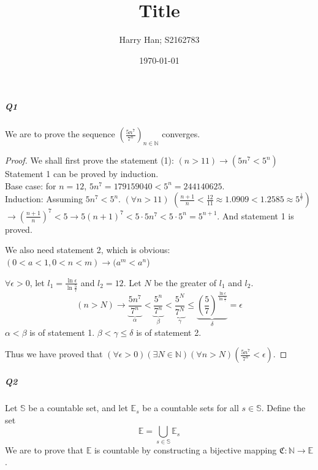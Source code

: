 \documentclass[12pt, a4paper]{article}
\title{Title}
\author{Harry Han; S2162783}
\date{\today}
\theoremstyle{definition}
\theoremstyle{remark}
\begin{document}
\subparagraph{Q1}
We are to prove the sequence $\left(\displaystyle \frac{5n^7}{7^n}\right)_{n \in \mathbb{N}}$ converges. 
\begin{proof}
	We shall first prove the statement (1): $(n>11)\rightarrow (5n^7<5^n)$
	Statement 1 can be proved by induction. \\
	Base case: for $n=12$, $5n^7 = 179159040<5^n=244140625.$ \\
	Induction: Assuming $5n^7<5^n$.
	$(\forall n>11)$ $(\frac{n+1}{n}<\frac{12}{11}\approx 1.0909<1.2585\approx 5^{\frac{1}{7}})$
	$\rightarrow (\frac{n+1}{n})^7<5 \rightarrow 5(n+1)^7 < 5\cdot 5n^7<5\cdot 5^n=5^{n+1}.$
	And statement 1 is proved. 

	We also need statement 2, which is obvious: $(0<a<1, 0<n<m) \rightarrow (a^m<a^n$)

	$\forall \epsilon > 0$, let $l_1 = \displaystyle \frac{\ln{\epsilon}}{\ln{\frac{5}{7}}}$ and $l_2 = 12$. 
	Let $N$ be the greater of $l_1$ and $l_2$. 
	$$
	(n>N) \rightarrow 
	\underbrace{\frac{5n^7}{7^n}}_{\alpha}
	<\underbrace{\frac{5^n}{7^n}}_{\beta}
	<\underbrace{\frac{5^N}{7^N}}_{\gamma}
	\leq \underbrace{
	\left(\frac{5}{7}\right)^{\frac{\ln{\epsilon}}{\ln{\frac{5}{7}}}}
	}_{\delta}
	=\epsilon
	$$
	$\alpha<\beta$ is of statement 1.
	$\beta<\gamma\leq \delta$ is of statement 2.


	Thus we have proved that $(\forall \epsilon > 0) (\exists N \in \mathbb{N}) (\forall n>N) (\displaystyle \frac{5n^7}{7^n}<\epsilon)$.
\end{proof}

\newpage

\subparagraph{Q2}

Let $\mathbb{S}$ be a countable set, and let $\mathbb{E}_s$ be a countable sets for all $s \in \mathbb{S}$.
Define the set 
\[\mathbb{E} =\displaystyle \bigcup_{s\in \mathbb{S}}\mathbb{E}_s \]
We are to prove that $\mathbb{E}$ is countable by constructing a bijective mapping $\mathfrak{C}: \mathbb{N}\rightarrow \mathbb{E}$.
\end{document}
